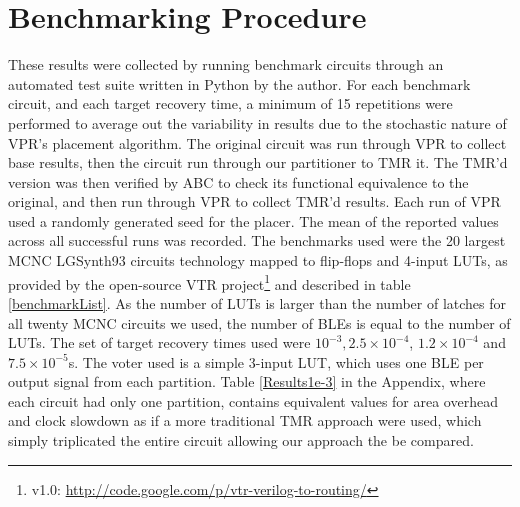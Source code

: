 \documentclass[12pt,final,oneside]{dwThesis} %
\begin{document}
   \section{Benchmarking Procedure}
   These results were
   collected by running benchmark circuits through an automated test suite
   written in Python by the author. For each benchmark circuit, and each target
   recovery time, a minimum of 15 repetitions were performed to average out the variability
   in results due to the stochastic nature of \gls{VPR}'s placement algorithm.
   The original circuit was run through \gls{VPR} to collect base results, then the
   circuit run through our partitioner to \gls{TMR} it. The \gls{TMR}'d version was then
   verified by \gls{ABC} to check its functional equivalence to the original,
   and then run through \gls{VPR} to collect \gls{TMR}'d results. Each run of \gls{VPR} used a
   randomly generated seed for the placer.  The mean of the reported values
   across all successful runs was recorded.  The benchmarks used were the 20
   largest \gls{MCNC} LGSynth93 circuits technology mapped to flip-flops and 4-input \glspl{LUT}, as provided by the open-source
   \gls{VTR} project\footnote{v1.0: \url{http://code.google.com/p/vtr-verilog-to-routing/}} and described in table
   \ref{benchmarkList}.
   As the number of \glspl{LUT} is larger than the number of latches for all twenty \gls{MCNC} circuits we used, the number of \glspl{BLE} is equal to the number of \glspl{LUT}.
    The set of target recovery times used were $10^{-3},
   2.5\times10^{-4}$, $1.2\times10^{-4}$ and $7.5\times10^{-5}$s.  The voter used is a simple
   3-input \gls{LUT}, which uses one \gls{BLE} per output signal from each
   partition.
   Table \ref{Results1e-3} in the Appendix, where each circuit had only one partition, contains equivalent values for area overhead and clock slowdown as if a 
   more traditional \gls{TMR} approach were used, which simply triplicated the entire circuit allowing our approach the be compared.
\end{document}

